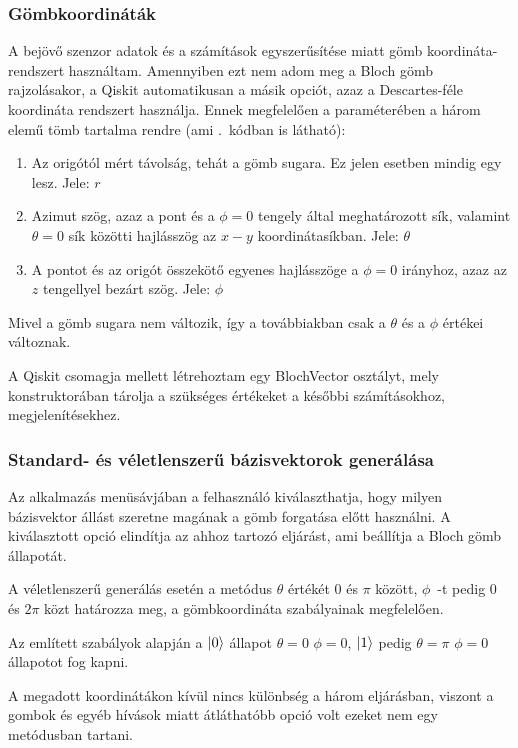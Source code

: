 \documentclass[
]{thesis-ekf}
\theoremstyle{definition}
\theoremstyle{remark}
\begin{document}
\subsubsection{Gömbkoordináták}
A bejövő szenzor adatok és a számítások egyszerűsítése miatt gömb koordináta-rendszert használtam. Amennyiben ezt nem adom meg a Bloch gömb rajzolásakor, a Qiskit automatikusan a másik opciót, azaz a  Descartes-féle koordináta rendszert használja. Ennek megfelelően a paraméterében a három elemű tömb tartalma rendre (ami \az{\ref{blochspherestart}}.~kódban is látható):

\begin{enumerate}
	\item Az origótól mért távolság, tehát a gömb sugara. Ez jelen esetben mindig egy lesz. Jele: $r$
	\item Azimut szög, azaz a pont és a $\phi=0$ tengely által meghatározott sík, valamint $\theta=0$ sík közötti hajlásszög az $x-y$ koordinátasíkban. Jele: $\theta$
	\item A pontot és az origót összekötő egyenes hajlásszöge a $\phi=0$ irányhoz, azaz az $z$ tengellyel bezárt szög. Jele: $\phi$
\end{enumerate}

Mivel a gömb sugara nem változik, így a továbbiakban csak a $\theta$ és a $\phi$ értékei változnak.

A Qiskit csomagja mellett létrehoztam egy BlochVector osztályt, mely konstruktorában tárolja a szükséges értékeket a későbbi számításokhoz, megjelenítésekhez.

\subsubsection{Standard- és véletlenszerű bázisvektorok generálása}
Az alkalmazás menüsávjában a felhasználó kiválaszthatja, hogy milyen bázisvektor állást szeretne magának a gömb forgatása előtt használni. A kiválasztott opció elindítja az ahhoz tartozó eljárást, ami beállítja a Bloch gömb állapotát.

A véletlenszerű generálás esetén a metódus $\theta$ értékét 0 és $\pi$ között, $\phi$~-t pedig 0 és $2\pi$ közt határozza meg, a gömbkoordináta szabályainak megfelelően.

Az említett szabályok alapján a $\ket{0}$ állapot $\theta=0$ $\phi=0$, $\ket{1}$ pedig $\theta=\pi$ $\phi=0$ állapotot fog kapni.

A megadott koordinátákon kívül nincs különbség a három eljárásban, viszont a gombok és egyéb hívások miatt átláthatóbb opció volt ezeket nem egy metódusban tartani.
\end{document}
